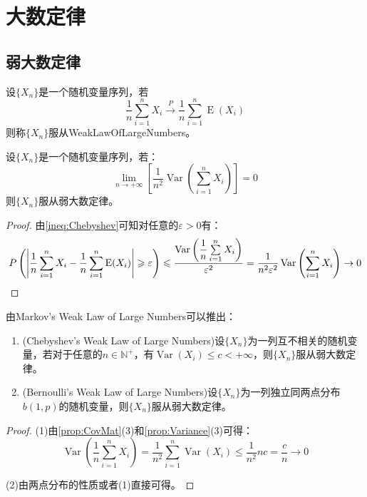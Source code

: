 \section{大数定律}

\subsection{弱大数定律}
\begin{definition}
	设$\{X_n\}$是一个随机变量序列，若
	\begin{equation*}
		\frac{1}{n}\sum_{i=1}^{n}X_i\overset{P}{\longrightarrow}\frac{1}{n}\sum_{i=1}^{n}\operatorname{E}(X_i)
	\end{equation*}
	则称$\{X_n\}$服从\gls{WeakLawOfLargeNumbers}。
\end{definition}
\begin{theorem}
	设$\{X_n\}$是一个随机变量序列，若：
	\begin{equation*}
		\lim_{n\to+\infty}\left[\frac{1}{n^2}\operatorname{Var}\left(\sum_{i=1}^{n}X_i\right)\right]=0
	\end{equation*}
	则$\{X_n\}$服从弱大数定律。
\end{theorem}
\begin{proof}
	由\cref{ineq:Chebyshev}可知对任意的$\varepsilon>0$有：
	\begin{equation*}
		P\left(\left|\frac{1}{n}\sum_{i=1}^{n}X_i-\frac{1}{n}\sum_{i=1}^{n}\operatorname{E}(X_i)\right|\geqslant\varepsilon\right)\leqslant\frac{\operatorname{Var}\left(\dfrac{1}{n}\sum\limits_{i=1}^{n}X_i\right)}{\varepsilon^2}=\frac{1}{n^2\varepsilon^2}\operatorname{Var}\left(\sum_{i=1}^{n}X_i\right)\to0\qedhere
	\end{equation*}
\end{proof}
\begin{corollary}
	由Markov's Weak Law of Large Numbers可以推出：
	\begin{enumerate}
		\item (Chebyshev's Weak Law of Large Numbers)设$\{X_n\}$为一列互不相关的随机变量，若对于任意的$n\in\mathbb{N}^+$，有$\operatorname{Var}(X_i)\leqslant c<+\infty$，则$\{X_n\}$服从弱大数定律。
		\item (Bernoulli's Weak Law of Large Numbers)设$\{X_n\}$为一列独立同两点分布$b(1,p)$的随机变量，则$\{X_n\}$服从弱大数定律。
	\end{enumerate}
\end{corollary}
\begin{proof}
	(1)由\cref{prop:CovMat}(3)和\cref{prop:Variance}(3)可得：
	\begin{equation*}
		\operatorname{Var}\left(\frac{1}{n}\sum_{i=1}^{n}X_i\right)=\frac{1}{n^2}\sum_{i=1}^{n}\operatorname{Var}(X_i)\leqslant\frac{1}{n^2}nc=\frac{c}{n}\to0
	\end{equation*}\par
	(2)由两点分布的性质或者(1)直接可得。
\end{proof}
